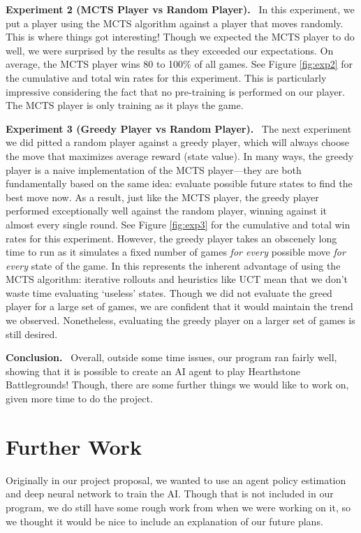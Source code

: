 \documentclass{paper}
\newcommand{\inlineSection}[1]{\vspace{0.5em}\noindent\textbf{#1.}~}
\begin{document}
\inlineSection{Experiment 2 (MCTS Player vs Random Player)} In this experiment, we put a player using the MCTS algorithm against a player that moves randomly. This is where things got interesting! Though we expected the MCTS player to do well, we were surprised by the results as they exceeded our expectations. On average, the MCTS player wins 80 to 100\% of all games. See Figure \ref{fig:exp2} for the cumulative and total win rates for this experiment. This is particularly impressive considering the fact that no pre-training is performed on our player.  The MCTS player is only training as it plays the game.

\inlineSection{Experiment 3 (Greedy Player vs Random Player)} The next experiment we did pitted a random player against a greedy player, which will always choose the move that maximizes average reward (state value). In many ways, the greedy player is a naive implementation of the MCTS player---they are both fundamentally based on the same idea: evaluate possible future states to find the best move now. As a result, just like the MCTS player, the greedy player performed exceptionally well against the random player, winning against it almost every single round. See Figure \ref{fig:exp3} for the cumulative and total win rates for this experiment. However, the greedy player takes an obscenely long time to run as it simulates a fixed number of games \textit{for every} possible move \textit{for every} state of the game. In this represents the inherent advantage of using the MCTS algorithm: iterative rollouts and heuristics like UCT mean that we don't waste time evaluating `useless' states. Though we did not evaluate the greed player for a large set of games, we are confident that it would maintain the trend we observed. Nonetheless, evaluating the greedy player on a larger set of games is still desired.

\inlineSection{Conclusion} Overall, outside some time issues, our program ran fairly well, showing that it is possible to create an AI agent to play Hearthstone Battlegrounds! Though, there are some further things we would like to work on, given more time to do the project. 

\section{Further Work}
Originally in our project proposal, we wanted to use an agent policy estimation and deep neural network to train the AI. Though that is not included in our program, we do still have some rough work from when we were working on it, so we thought it would be nice to include an explanation of our future plans. 
\end{document}
